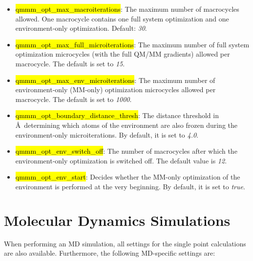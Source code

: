\documentclass[]{tufte-book}
\begin{document}
{{\begin{itemize}
\item \hl{qmmm\_opt\_max\_macroiterations}: The maximum number of macrocycles allowed. One macrocycle contains one full system optimization and one environment-only optimization. Default: \textit{30}.
\item \hl{qmmm\_opt\_max\_full\_microiterations}: The maximum number of full system optimization microcycles (with the full QM/MM gradients) allowed per macrocycle. The default is set to \textit{15}.
\item \hl{qmmm\_opt\_max\_env\_microiterations}: The maximum number of environment-only (MM-only) optimization microcycles allowed per macrocycle. The default is set to \textit{1000}.
\item \hl{qmmm\_opt\_boundary\_distance\_thresh}: The distance threshold in \AA~determining which atoms of the environment are also frozen during the environment-only microiterations. By default, it is set to \textit{4.0}.
\item \hl{qmmm\_opt\_env\_switch\_off}: The number of macrocycles after which the environment-only optimization is switched off. The default value is \textit{12}.
\item \hl{qmmm\_opt\_env\_start}: Decides whether the MM-only optimization of the environment is performed at the very beginning. By default, it is set to \textit{true}.
\end{itemize}


\chapter{Molecular Dynamics Simulations}\label{ch:md_simulation}

When performing an MD simulation, all settings for the single point calculations are also available. Furthermore, the following MD-specific settings are:

}}
\end{document}
